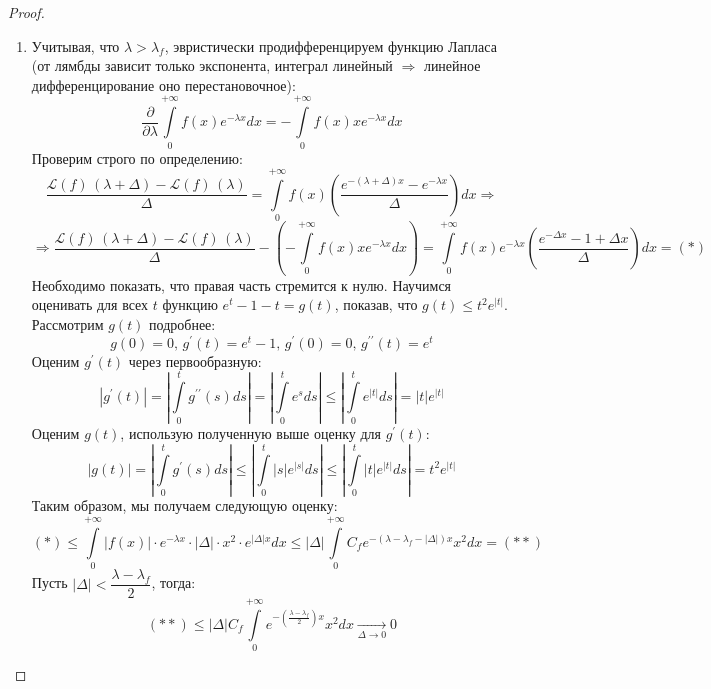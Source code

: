 \documentclass[12pt]{article}
\newcommand{\ML}{\mathcal{L}}
\theoremstyle{definition}
\newcommand{\ddint}[2]{\displaystyle\int\limits_{#1}^{#2}}
\begin{document}
\begin{proof}
\begin{enumerate}[label ={(\arabic*)}]
		\item Учитывая, что $\lambda > \lambda_f$, эвристически продифференцируем функцию Лапласа (от лямбды зависит только экспонента, интеграл линейный $\Rightarrow$ линейное дифференцирование оно перестановочное):
		$$
			\dfrac{\partial}{\partial \lambda}\ddint{0}{+\infty}f(x)e^{-\lambda x} dx = -\ddint{0}{+\infty}f(x)xe^{-\lambda x}dx
		$$
		Проверим строго по определению:
		$$
			\dfrac{\ML(f)\, (\lambda + \Delta) - \ML(f)\, (\lambda)}{\Delta} = \ddint{0}{+\infty}f(x)\left(\dfrac{e^{-(\lambda + \Delta)x} - e^{-\lambda x}}{\Delta}\right)dx \Rightarrow
		$$
		$$
			\Rightarrow \dfrac{\ML(f)\, (\lambda + \Delta) - \ML(f)\, (\lambda)}{\Delta} - \left(-\ddint{0}{+\infty}f(x)xe^{-\lambda x}dx\right) = \ddint{0}{+\infty}f(x)e^{-\lambda x}\left(\dfrac{e^{-\Delta x} - 1 + \Delta x}{\Delta}\right)dx =(*)
		$$
		Необходимо показать, что правая часть стремится к нулю. Научимся оценивать для всех $t$ функцию $e^t - 1 - t = g(t)$, показав, что $g(t) \leq t^2 e^{|t|}$. Рассмотрим $g(t)$ подробнее:
		$$
			g(0) = 0, \, g^\prime(t) = e^t - 1, \, g^\prime(0) = 0, \, g^{\prime\prime}(t) = e^t 
		$$
		Оценим $g^\prime(t)$ через первообразную:		
		$$
			\left|g^\prime(t)\right| = \left|\ddint{0}{t}g^{\prime\prime}(s)ds\right| =  \left|\ddint{0}{t}e^sds\right| \leq \left|\ddint{0}{t}e^{|t|}ds\right| = |t|e^{|t|}
		$$
		Оценим $g(t)$, использую полученную выше оценку для $g^\prime(t)$:
		$$
			|g(t)| = \left|\ddint{0}{t}g^\prime(s)ds\right|  \leq \left|\ddint{0}{t}|s|e^{|s|}ds\right| \leq \left|\ddint{0}{t}|t|e^{|t|}ds\right| = t^2 e^{|t|}
		$$
		Таким образом, мы получаем следующую оценку:
		$$
			(*) \leq \ddint{0}{+\infty}|f(x)|{\cdot}e^{-\lambda x}{\cdot}|\Delta|{\cdot}x^2{\cdot}e^{|\Delta|x}dx \leq |\Delta|\ddint{0}{+\infty}C_f e^{-(\lambda - \lambda_f - |\Delta|)x}x^2dx =(**)
		$$
		Пусть $|\Delta| < \dfrac{\lambda - \lambda_f}{2}$, тогда:
		$$
			(**) \leq |\Delta|C_f \ddint{0}{+\infty}e^{-\left(\tfrac{\lambda - \lambda_f}{2}\right)x}x^2dx \xrightarrow[\Delta \to 0]{} 0
		$$
	\end{enumerate}
\end{proof}
\end{document}
